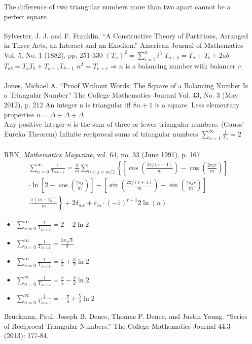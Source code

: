 \documentclass{article}
\begin{document}
\begin{outline}[enumerate]
			The difference of two triangular numbers more than two apart cannot be a perfect square. \\\\
			Sylvester, J. J.  and F. Franklin. ``A Constructive Theory of Partitions, Arranged in Three Acts, an Interact and an Exodion.'' American Journal of Mathematics 
			Vol. 5, No. 1 (1882), pp. 251-330
		\3 $(T_n)^2 = \sum_{i=1}^n i^3$
		\3 $T_{a+b} = T_a + T_b + 2ab$
		\3 $T_{ab} = T_aT_b + T_{a-1}T_{b-1}$
		\3 $n^2 = T_{n+r} \Rightarrow n$ is a balancing number with balancer $r$.\\\\
			Jones, Michael A. ``Proof Without Words: The Square of a Balancing Number Is a Triangular Number''
			The College Mathematics Journal Vol. 43, No. 3 (May 2012), p. 212
		\3 An integer n is triangular iff $8n+1$ is a square.
	\2 Less elementary properties
		\3 $n = \Delta + \Delta + \Delta$\\Any positive integer $n$ is the sum of three or fewer triangular numbers. (Gauss' Eureka Theorem)
		\3 Infinite reciprocal sums of triangular numbers
			\4 $\sum_{n=1}^\infty \frac{1}{T_n} = 2$ \\\\ RBN, \textit{Mathematics Magazine}, vol. 64, no. 33 (June 1991), p. 167
			\4 \begin{multline*}
				\sum_{n=0}^\infty \frac{1}{T_{mn+r}} = 
				\frac{2}{m} \sum\limits_{0<j<m/2} \left\{ 
				\left[
					\cos \left(\frac{2 \pi j (r+1)}{m} \right) - \cos \left( \frac{2 \pi j r}{m} \right)
				\right] \right. \\
				\left. \cdot \ln \left[ 
				2 - \cos \left( \frac{2 \pi j}{m} \right)
				\right]
				- \left[ \sin \left(\frac{2 \pi j (r+1)}{m} \right) - \sin \left( \frac{2 \pi j r}{m} \right) \right] \right. \\
				\left. \cdot \frac{\pi (m - 2j)}{m}
				\right\} + 2 \delta_{mr} + \varepsilon_m \cdot (-1)^{r+1} 2 \ln(n)
			\end{multline*}
			\begin{itemize}
				\item $\sum_{n=0}^\infty \frac{1}{T_{2n+2}} = 2 - 2 \ln 2$
				\item $\sum_{n=0}^\infty \frac{1}{T_{3n+1}} = \frac{2 \pi \sqrt{3}}{9}$
				\item $\sum_{n=0}^\infty \frac{1}{T_{4n+1}} = \frac{\pi}{4} + \frac{3}{2}\ln 2$
				\item $\sum_{n=0}^\infty \frac{1}{T_{4n+2}} = \frac{\pi}{4} - \frac{3}{2}\ln 2$
				\item $\sum_{n=0}^\infty \frac{1}{T_{4n+3}} = - \frac{\pi}{4} + \frac{5}{2}\ln 2$
			\end{itemize}
			Bruckman, Paul, Joseph B. Dence, Thomas P. Dence, and Justin Young. ``Series of Reciprocal Triangular Numbers.'' The College Mathematics Journal 44.3 (2013): 177-84.
			

\end{outline}
\end{document}
